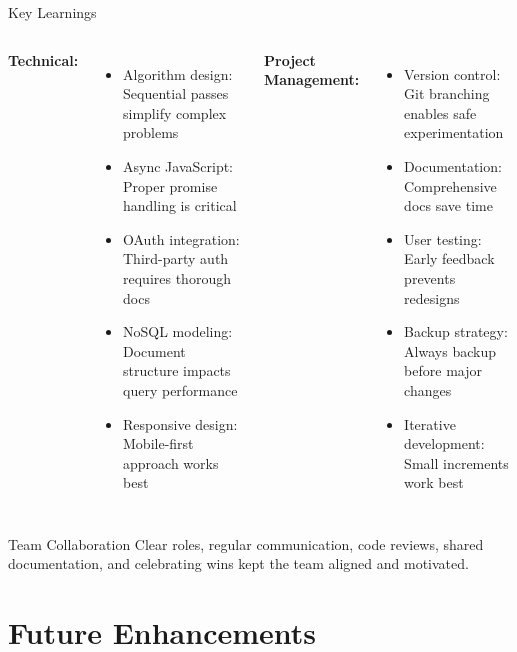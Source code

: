 \documentclass[aspectratio=169]{beamer}
\begin{document}
\begin{frame}{Key Learnings}
\begin{columns}
\textbf{Technical:}
\begin{itemize}
    \item Algorithm design: Sequential passes simplify complex problems
    \item Async JavaScript: Proper promise handling is critical
    \item OAuth integration: Third-party auth requires thorough docs
    \item NoSQL modeling: Document structure impacts query performance
    \item Responsive design: Mobile-first approach works best
\end{itemize}

\textbf{Project Management:}
\begin{itemize}
    \item Version control: Git branching enables safe experimentation
    \item Documentation: Comprehensive docs save time
    \item User testing: Early feedback prevents redesigns
    \item Backup strategy: Always backup before major changes
    \item Iterative development: Small increments work best
\end{itemize}
\end{columns}

\vspace{0.5cm}
\begin{block}{Team Collaboration}
Clear roles, regular communication, code reviews, shared documentation, and celebrating wins kept the team aligned and motivated.
\end{block}
\end{frame}

\section{Future Enhancements}
\end{document}
